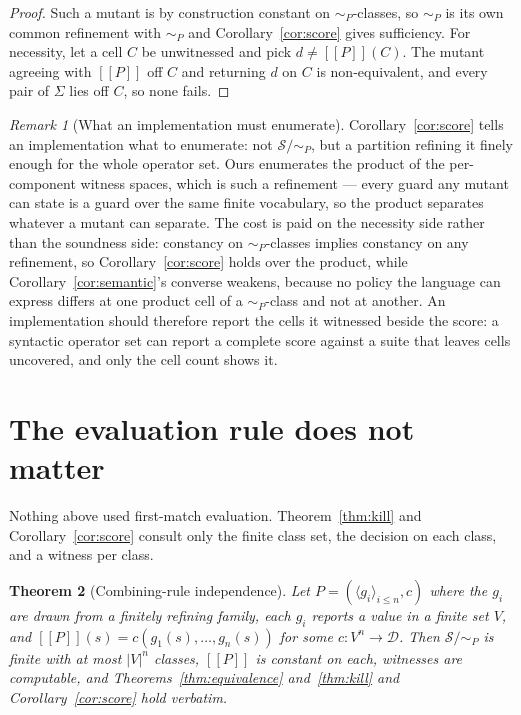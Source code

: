 \documentclass[11pt,a4paper]{article}
\theoremstyle{plain}
\newtheorem{theorem}{Theorem}
\theoremstyle{definition}
\theoremstyle{remark}
\newtheorem{remark}[theorem]{Remark}
\newcommand{\sem}[1]{[\![#1]\!]}
\newcommand{\Dom}{\mathcal{D}}
\newcommand{\Sub}{\mathcal{S}}
\begin{document}
\begin{proof}
Such a mutant is by construction constant on $\sim_P$-classes, so $\sim_P$ is its own common
refinement with $\sim_P$ and Corollary~\ref{cor:score} gives sufficiency. For necessity, let
a cell $C$ be unwitnessed and pick $d \neq \sem{P}(C)$. The mutant agreeing with $\sem{P}$
off $C$ and returning $d$ on $C$ is non-equivalent, and every pair of $\Sigma$ lies off $C$,
so none fails.
\end{proof}

\begin{remark}[What an implementation must enumerate]
\label{rem:refinement}
Corollary~\ref{cor:score} tells an implementation what to enumerate: not $\Sub/{\sim_P}$,
but a partition refining it finely enough for the whole operator set. Ours enumerates the
product of the per-component witness spaces, which is such a refinement --- every guard any
mutant can state is a guard over the same finite vocabulary, so the product separates
whatever a mutant can separate. The cost is paid on the necessity side rather than the
soundness side: constancy on $\sim_P$-classes implies constancy on any refinement, so
Corollary~\ref{cor:score} holds over the product, while Corollary~\ref{cor:semantic}'s
converse weakens, because no policy the language can express differs at one product cell of
a $\sim_P$-class and not at another. An implementation should therefore report the cells it
witnessed beside the score: a syntactic operator set can report a complete score against a
suite that leaves cells uncovered, and only the cell count shows it.
\end{remark}

\section{The evaluation rule does not matter}
\label{sec:combining}

Nothing above used first-match evaluation. Theorem~\ref{thm:kill} and
Corollary~\ref{cor:score} consult only the finite class set, the decision on each class, and
a witness per class.

\begin{theorem}[Combining-rule independence]
\label{thm:combining}
Let $P = (\langle g_i \rangle_{i \le n}, c)$ where the $g_i$ are drawn from a finitely
refining family, each $g_i$ reports a value in a finite set $V$, and
$\sem{P}(s) = c(g_1(s),\dots,g_n(s))$ for some $c : V^n \to \Dom$. Then $\Sub/{\sim_P}$ is
finite with at most $|V|^n$ classes, $\sem{P}$ is constant on each, witnesses are computable,
and Theorems~\ref{thm:equivalence} and~\ref{thm:kill} and Corollary~\ref{cor:score} hold
verbatim.
\end{theorem}
\end{document}

